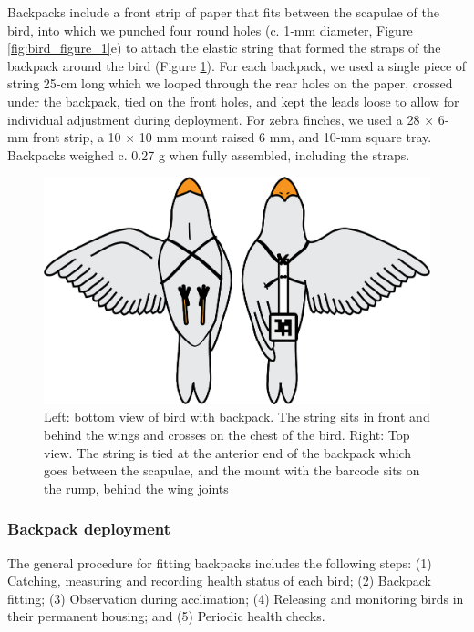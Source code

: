 \documentclass[11pt,a4paper,oneside]{book}
\begin{document}
\begin{doublespace}
Backpacks include a front strip of paper that fits between the scapulae of the bird, into which we punched four round holes (c. 1‐mm diameter, Figure \ref{fig:bird_figure_1}e) to attach the elastic string that formed the straps of the backpack around the bird (Figure \ref{fig:bird_figure_2}). For each backpack, we used a single piece of string 25‐cm long which we looped through the rear holes on the paper, crossed under the backpack, tied on the front holes, and kept the leads loose to allow for individual adjustment during deployment. For zebra finches, we used a 28 $\times$ 6‐mm front strip, a 10 $\times$ 10 mm mount raised 6 mm, and 10‐mm square tray. Backpacks weighed c. 0.27 g when fully assembled, including the straps.

\begin{figure}[!htb]
    \centering
    \includegraphics{Graving_IMPRS_Thesis/figures/bird_figure_2.jpg}
    \caption{Left: bottom view of bird with backpack. The string sits in front and behind the wings and crosses on the chest of the bird. Right: Top view. The string is tied at the anterior end of the backpack which goes between the scapulae, and the mount with the barcode sits on the rump, behind the wing joints}
    \label{fig:bird_figure_2}
\end{figure}
\subsubsection{Backpack deployment}
The general procedure for fitting backpacks includes the following steps: (1) Catching, measuring and recording health status of each bird; (2) Backpack fitting; (3) Observation during acclimation; (4) Releasing and monitoring birds in their permanent housing; and (5) Periodic health checks.


\end{doublespace}
\end{document}

